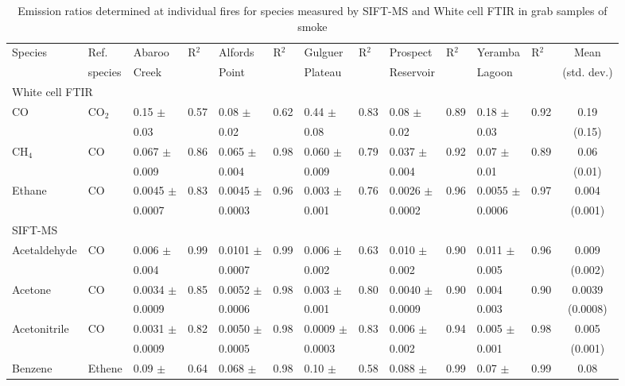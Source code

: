 \documentclass[acp, manuscript]{copernicus}
\begin{document}
\begin{sidewaystable}
  \caption{Emission ratios determined at individual fires for species measured by SIFT-MS and White cell FTIR in grab samples of smoke}
  \begin{tabular}{l l l l l l l l l l l l c }
    \hline
    Species& Ref. & Abaroo & R$^2$ & Alfords  & R$^2$&Gulguer  &R$^2$&Prospect &R$^2$&Yeramba&R$^2$& Mean  \\
    &species& Creek&&Point &&Plateau &&Reservoir&& Lagoon &&(std. dev.)\\
    \hline 
    \multicolumn{2}{l}{White cell FTIR} &&&&&&&&&&&\\ 
    \hline 
    CO& CO$_2$& 0.15 $\pm$ &0.57&0.08 $\pm$  & 0.62&0.44 $\pm$  & 0.83 & 0.08 $\pm$  & 0.89& 0.18 $\pm$ & 0.92 & 0.19  \\
    &&0.03&&0.02&&0.08&&0.02&&0.03&&(0.15)\\
    CH$_4$ & CO & 0.067 $\pm$  & 0.86 & 0.065 $\pm$ &0.98 & 0.060 $\pm$ & 0.79 & 0.037 $\pm$  & 0.92 & 0.07 $\pm$  &0.89&0.06 \\
    &&0.009&&0.004&&0.009&&0.004&&0.01&&(0.01)\\
    Ethane&CO&0.0045 $\pm$ &0.83&0.0045 $\pm$ &0.96&0.003 $\pm$ &0.76&0.0026 $\pm$ &0.96&0.0055 $\pm$ & 0.97&0.004\\
    && 0.0007&& 0.0003&& 0.001&& 0.0002&& 0.0006&&(0.001)\\
    \hline
    SIFT-MS & && & &&&&&&&&\\ 
    \hline
    Acetaldehyde & CO &0.006 $\pm$ &0.99&0.0101 $\pm$ &0.99&0.006 $\pm$ & 0.63&0.010 $\pm$ &0.90&0.011 $\pm$ &0.96&0.009\\
     && 0.004&& 0.0007&& 0.002&& 0.002&& 0.005&&(0.002)\\
    Acetone & CO & 0.0034 $\pm$&0.85&0.0052 $\pm$&0.98&0.003 $\pm$&0.80& 0.0040 $\pm$&0.90&0.004&0.90&0.0039 \\
    &&0.0009&&0.0006&&0.001&&0.0009&&0.003&&(0.0008)\\
    Acetonitrile & CO & 0.0031 $\pm$ &0.82&0.0050 $\pm$&0.98&0.0009 $\pm$&0.83&0.006 $\pm$&0.94&0.005 $\pm$&0.98&0.005\\
    &&0.0009&&0.0005&&0.0003&&0.002&&0.001&&(0.001)\\
    Benzene & Ethene &0.09 $\pm$ &0.64&0.068 $\pm$&0.98&0.10 $\pm$& 0.58&0.088 $\pm$&0.99&0.07 $\pm$&0.99&0.08 \\

\end{tabular}
\end{sidewaystable}
\end{document}
